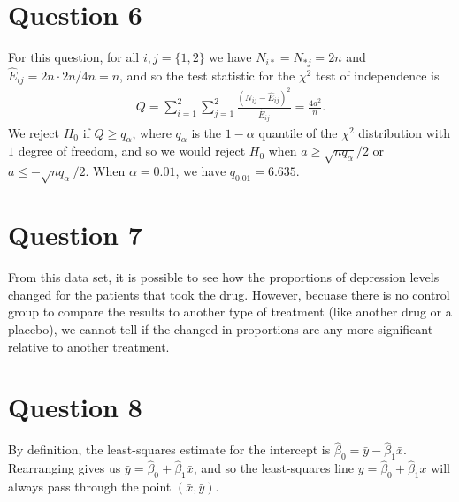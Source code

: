 \documentclass[10pt]{article}
\begin{document}
\section{Question 6} \noindent
For this question, for all \(i,j = \{1,2\}\) we have \(N_{i*} = N_{*j} = 2n\) and \(\hat{E}_{ij} = 2n \cdot 2n / 4n = n\), and so the test statistic for the 
\(\chi^2\) test of independence is 
\begin{align*}
    Q
    = \sum_{i=1}^2 \sum_{j=1}^2 \frac{(N_{ij} - \hat{E}_{ij})^2}{\hat{E}_{ij}}
    = \frac{4 a^2}{n}.
\end{align*}
We reject \(H_0\) if \(Q \ge q_{\alpha}\), where \(q_{\alpha}\) is the \(1 - \alpha\) quantile of the \(\chi^2\) distribution with 
\(1\) degree of freedom, and so we would reject \(H_0\) when \(a \ge \sqrt{n q_{\alpha}} / 2\) or \(a \le - \sqrt{n q_{\alpha}} / 2\).
When \(\alpha = 0.01\), we have \(q_{0.01} = 6.635\).

\section{Question 7} \noindent
From this data set, it is possible to see how the proportions of depression levels changed for the patients that took the drug. However, becuase there is no 
control group to compare the results to another type of treatment (like another drug or a placebo), we cannot tell if the changed in proportions are any 
more significant relative to another treatment. 

\section{Question 8} \noindent
By definition, the least-squares estimate for the intercept is \(\hat{\beta}_0 = \bar{y} - \hat{\beta}_1 \bar{x}\).
Rearranging gives us \(\bar{y} = \hat{\beta}_0 + \hat{\beta}_1 \bar{x}\), and so the least-squares line \(y = \hat{\beta}_0 + \hat{\beta}_1 x\) will always 
pass through the point \((\bar{x}, \bar{y})\).

\end{document}
